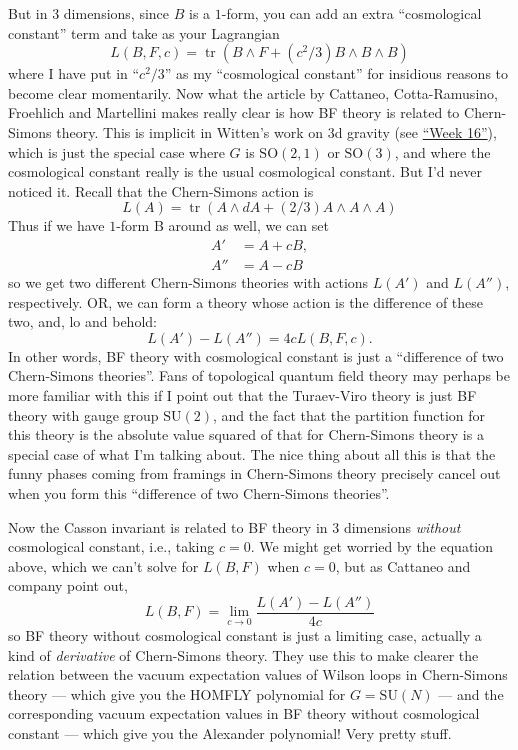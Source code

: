 \documentclass{article}
\begin{document}
But in 3 dimensions, since \(B\) is a \(1\)-form, you can add an extra
``cosmological constant'' term and take as your Lagrangian
\[L(B,F,c) = \operatorname{tr}(B \wedge F + (c^2/3) B \wedge B \wedge B)\]
where I have put in ``\(c^2/3\)'' as my ``cosmological constant'' for
insidious reasons to become clear momentarily. Now what the article by
Cattaneo, Cotta-Ramusino, Froehlich and Martellini makes really clear is
how BF theory is related to Chern-Simons theory. This is implicit in
Witten's work on 3d gravity (see \protect\hyperlink{week16}{``Week
16''}), which is just the special case where \(G\) is
\(\mathrm{SO}(2,1)\) or \(\mathrm{SO}(3)\), and where the cosmological
constant really is the usual cosmological constant. But I'd never
noticed it. Recall that the Chern-Simons action is
\[L(A) = \operatorname{tr}(A \wedge dA + (2/3)A \wedge A \wedge A)\]
Thus if we have \(1\)-form B around as well, we can set \[
  \begin{aligned}
    A' &= A + cB,
  \\A'' &= A - cB
  \end{aligned}
\] so we get two different Chern-Simons theories with actions \(L(A')\)
and \(L(A'')\), respectively. OR, we can form a theory whose action is
the difference of these two, and, lo and behold:
\[L(A') - L(A'') = 4cL(B,F,c).\] In other words, BF theory with
cosmological constant is just a ``difference of two Chern-Simons
theories''. Fans of topological quantum field theory may perhaps be more
familiar with this if I point out that the Turaev-Viro theory is just BF
theory with gauge group \(\mathrm{SU}(2)\), and the fact that the
partition function for this theory is the absolute value squared of that
for Chern-Simons theory is a special case of what I'm talking about. The
nice thing about all this is that the funny phases coming from framings
in Chern-Simons theory precisely cancel out when you form this
``difference of two Chern-Simons theories''.

Now the Casson invariant is related to BF theory in 3 dimensions
\emph{without} cosmological constant, i.e., taking \(c = 0\). We might
get worried by the equation above, which we can't solve for \(L(B,F)\)
when \(c = 0\), but as Cattaneo and company point out,
\[L(B,F) = \lim_{c\to0}\frac{L(A')-L(A'')}{4c}\] so BF theory without
cosmological constant is just a limiting case, actually a kind of
\emph{derivative} of Chern-Simons theory. They use this to make clearer
the relation between the vacuum expectation values of Wilson loops in
Chern-Simons theory --- which give you the HOMFLY polynomial for
\(G = \mathrm{SU}(N)\) --- and the corresponding vacuum expectation
values in BF theory without cosmological constant --- which give you the
Alexander polynomial! Very pretty stuff.
\end{document}
